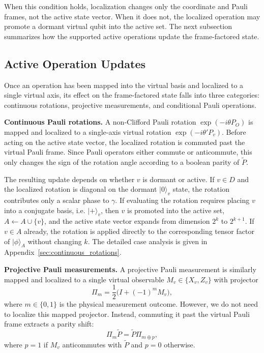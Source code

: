 \documentclass[a4paper, onecolumn, unpublished]{quantumarticle}
\begin{document}
    When this condition holds, localization changes only the coordinate and Pauli frames, not the active state vector. When it does not, the localized operation may promote a dormant virtual qubit into the active set. The next subsection summarizes how the supported active operations update the frame-factored state.

    \subsection{Active Operation Updates}
    \label{sec:active_updates}

    Once an operation has been mapped into the virtual basis and localized to a single virtual axis, its effect on the frame-factored state falls into three categories: continuous rotations, projective measurements, and conditional Pauli operations.

    \textbf{Continuous Pauli rotations.}
    A non-Clifford Pauli rotation $\exp(-i\theta P_O)$ is mapped and localized to a single-axis virtual rotation $\exp(-i\theta' P_v)$. Before acting on the active state vector, the localized rotation is commuted past the virtual Pauli frame. Since Pauli operators either commute or anticommute, this only changes the sign of the rotation angle according to a boolean parity of $\tilde{P}$.

    The resulting update depends on whether $v$ is dormant or active. If $v \in D$ and the localized rotation is diagonal on the dormant $|0\rangle_v$ state, the rotation contributes only a scalar phase to $\gamma$. If evaluating the rotation requires placing $v$ into a conjugate basis, i.e. $|+\rangle_v$, then $v$ is promoted into the active set, $A \leftarrow A \cup \{v\}$, and the active state vector expands from dimension $2^k$ to $2^{k+1}$. If $v \in A$ already, the rotation is applied directly to the corresponding tensor factor of $|\phi\rangle_A$ without changing $k$. The detailed case analysis is given in Appendix~\ref{sec:continuous_rotations}.

    \textbf{Projective Pauli measurements.}
    A projective Pauli measurement is similarly mapped and localized to a single virtual observable $M_v \in \{X_v,Z_v\}$ with projector
    \begin{equation}
        \Pi_m = \frac{1}{2}\bigl(I + (-1)^m M_v\bigr),
    \end{equation}
    where $m \in \{0,1\}$ is the physical measurement outcome. However, we do not need to localize this mapped projector. Instead, commuting it past the virtual Pauli frame extracts a parity shift:
    \begin{equation}
        \Pi_m \tilde{P}
        =
        \tilde{P}\Pi_{m \oplus p},
    \end{equation}
    where $p=1$ if $M_v$ anticommutes with $\tilde{P}$ and $p=0$ otherwise.
\end{document}
